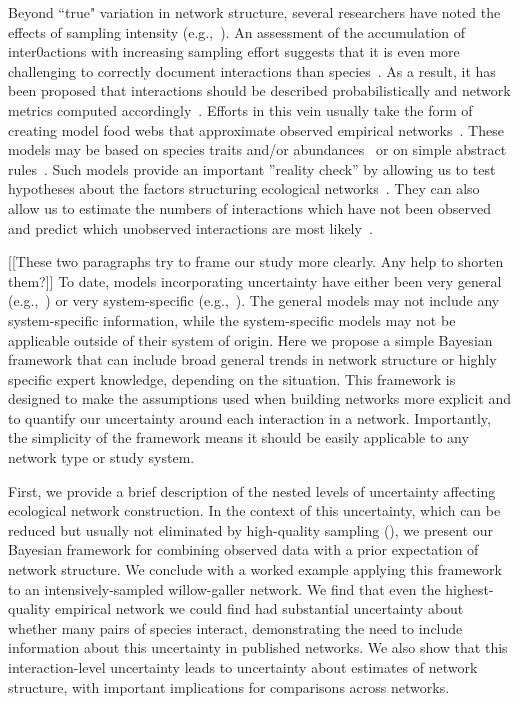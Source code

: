 \documentclass[12pt]{article}
\begin{document}
\begin{spacing}{2.0}
    Beyond ``true" variation in network structure, several researchers have noted the effects of sampling intensity (e.g.,~\citealp{Martinez1999,Bluthgen2006,Bluthgen2007,Jordano2016}). An assessment of the accumulation of inter0actions with increasing sampling effort suggests that it is even more challenging to correctly document interactions than species~\citep{Guimera2009,Poisot2012,Bartomeus2013,Jordano2016,Giron2018,Graham2018}. As a result, it has been proposed that interactions should be described probabilistically and network metrics computed accordingly~\citep{Bartomeeus2013,Poisot2016}. Efforts in this vein usually take the form of creating model food webs that approximate observed empirical networks~\citep{Allesina2008,Guimera2009,Williams2010,Rohr2016}. These models may be based on species traits and/or abundances~\citep{Rohr2016,Weinstein2017,Weinstein2017a,Graham2018} or on simple abstract rules~\citep{Allesina2008,Guimera2009,Williams2010}. Such models provide an important ''reality check'' by allowing us to test hypotheses about the factors structuring ecological networks~\citep{Bartomeus2013,Weinstein2017.Weinstein2017a,Graham2018}. They can also allow us to estimate the numbers of interactions which have not been observed~\citep{Jordano2016,Weinstein2017a} and predict which unobserved interactions are most likely~\citep{Guimera2009,Bartomeus2013}. 


    [[These two paragraphs try to frame our study more clearly. Any help to shorten them?]]
    To date, models incorporating uncertainty have either been very general (e.g.,~\citet{Guimera2009,Gravel2013}) or very system-specific (e.g.,~\citet{Bartomeus2013,Weinstein2017,Weinstein2017a,Graham2018}). The general models may not include any system-specific information, while the system-specific models may not be applicable outside of their system of origin. Here we propose a simple Bayesian framework that can include broad general trends in network structure or highly specific expert knowledge, depending on the situation. This framework is designed to make the assumptions used when building networks more explicit and to quantify our uncertainty around each interaction in a network. Importantly, the simplicity of the framework means it should be easily applicable to any network type or study system.


    First, we provide a brief description of the nested levels of uncertainty affecting ecological network construction. In the context of this uncertainty, which can be reduced but usually not eliminated by high-quality sampling (\citealp[see Box 1]{Bartomes2013}), we present our Bayesian framework for combining observed data with a prior expectation of network structure. We conclude with a worked example applying this framework to an intensively-sampled willow-galler network. We find that even the highest-quality empirical network we could find had substantial uncertainty about whether many pairs of species interact, demonstrating the need to include information about this uncertainty in published networks. We also show that this interaction-level uncertainty leads to uncertainty about estimates of network structure, with important implications for comparisons across networks.



\end{spacing}
\end{document}
